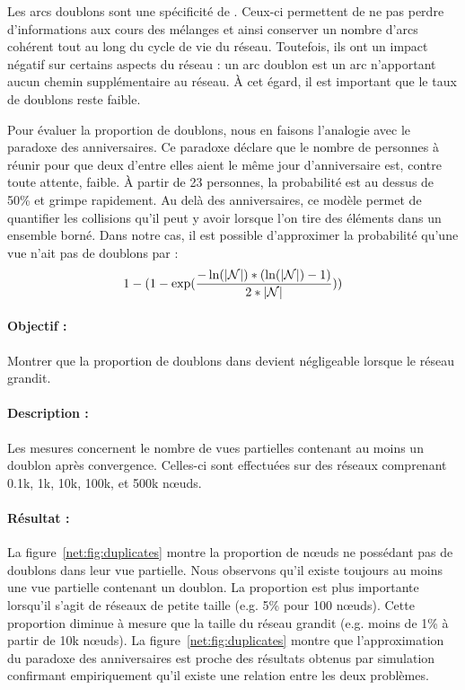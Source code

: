 Les arcs doublons sont une spécificité de \SPRAY. Ceux-ci permettent de ne pas
perdre d'informations aux cours des mélanges et ainsi conserver un nombre
d'arcs cohérent tout au long du cycle de vie du réseau. Toutefois, ils ont un
impact négatif sur certains aspects du réseau : un arc doublon est un arc
n'apportant aucun chemin supplémentaire au réseau. À cet égard, il est important
que le taux de doublons reste faible.

Pour évaluer la proportion de doublons, nous en faisons l'analogie avec le
paradoxe des anniversaires.  Ce paradoxe déclare que le nombre de personnes à
réunir pour que deux d'entre elles aient le même jour d'anniversaire est, contre
toute attente, faible. À partir de 23 personnes, la probabilité est au dessus de
50\% et grimpe rapidement. Au delà des anniversaires, ce modèle permet de
quantifier les collisions qu'il peut y avoir lorsque l'on tire des éléments dans
un ensemble borné. Dans notre cas, il est possible d'approximer la probabilité
qu'une vue n'ait pas de doublons par :
\begin{equation*}
  1-
  (1-
  \exp({-\ln(|\mathcal{N}|)*(\ln(|\mathcal{N}|)-1)\over{2*|\mathcal{N}|}}))
\end{equation*}

\paragraph{Objectif :} Montrer que la proportion de doublons dans \SPRAY devient
négligeable lorsque le réseau grandit.

\paragraph{Description :} Les mesures concernent le nombre de vues partielles
contenant au moins un doublon après convergence. Celles-ci sont effectuées sur
des réseaux comprenant 0.1k, 1k, 10k, 100k, et 500k nœuds.

\paragraph{Résultat :} La figure~\ref{net:fig:duplicates} montre la proportion
de nœuds ne possédant pas de doublons dans leur vue partielle. Nous observons
qu'il existe toujours au moins une vue partielle contenant un doublon. La
proportion est plus importante lorsqu'il s'agit de réseaux de petite taille
(e.g. 5\% pour 100 nœuds). Cette proportion diminue à mesure que la taille du
réseau grandit (e.g. moins de 1\% à partir de 10k nœuds). La
figure~\ref{net:fig:duplicates} montre que l'approximation du paradoxe des
anniversaires est proche des résultats obtenus par simulation confirmant
empiriquement qu'il existe une relation entre les deux problèmes.

